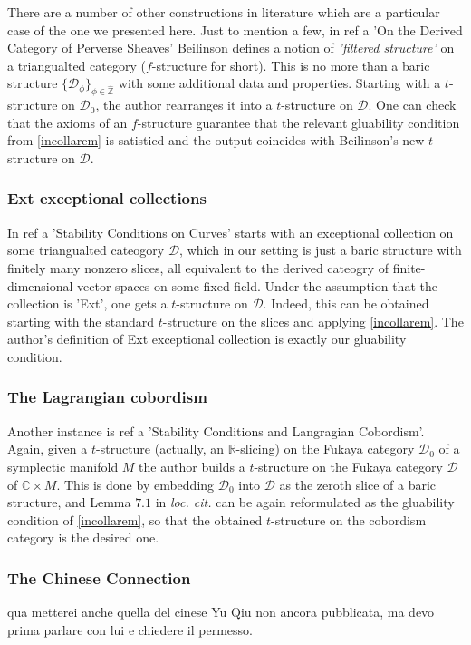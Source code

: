 \documentclass{article}
\newcommand\blankpage{
    \null
    \thispagestyle{empty}
    \addtocounter{page}{-1}
    \newpage}
\theoremstyle{definition}
\newcommand{\Z}{\mathbb{Z}}
\begin{document}
There are a number of other constructions in literature which are a particular case of the one we presented here. Just to mention a few, in {\color{red} ref a 'On the Derived Category of Perverse Sheaves'} Beilinson defines a notion of \textit{'filtered structure'} on a triangualted category ($f$-structure for short). This is no more than a baric structure $\{ \mathscr{D}_{\phi} \}_{\phi \in \hat{\Z}}$ with some additional data and properties. Starting with a $t$-structure on $\mathscr{D}_0$, the author rearranges it into a $t$-structure on $\mathscr{D}$. One can check that the axioms of an $f$-structure guarantee that the relevant gluability condition from \ref{incollarem} is satistied and the output coincides with Beilinson's new $t$-structure on $\mathscr{D}$. \\ 

\subsubsection{Ext exceptional collections}

In {\color{red} ref a 'Stability Conditions on Curves'} starts with an exceptional collection on some triangualted cateogory $\mathscr{D}$, which in our setting is just a baric structure with finitely many nonzero slices, all equivalent to the derived cateogry of finite-dimensional vector spaces on some fixed field. Under the assumption that the collection is 'Ext', one gets a $t$-structure on $\mathscr{D}$. Indeed, this can be obtained starting with the standard $t$-structure on the slices and applying \ref{incollarem}. The author's definition of Ext exceptional collection is exactly our gluability condition. \\

\subsubsection{The Lagrangian cobordism}

Another instance is {\color{red} ref a 'Stability Conditions and Langragian Cobordism'}. Again, given a $t$-structure (actually, an $\mathbb{R}$-slicing) on the Fukaya category $\mathscr{D}_0$ of a symplectic manifold $M$ the author builds a $t$-structure on the Fukaya category $\mathscr{D}$ of $\mathbb{C} \times M$. This is done by embedding $\mathscr{D}_0$ into $\mathscr{D}$ as the zeroth slice of a baric structure, and Lemma $7.1$ in \textit{loc. cit.} can be again reformulated as the gluability condition of \ref{incollarem}, so that the obtained $t$-structure on the cobordism category is the desired one. \\

\subsubsection{The Chinese Connection}
{\color{red} qua metterei anche quella del cinese Yu Qiu non ancora pubblicata, ma devo prima parlare con lui e chiedere il permesso}. 

\newpage

\afterpage{\blankpage}
\clearpage 

\end{document}
